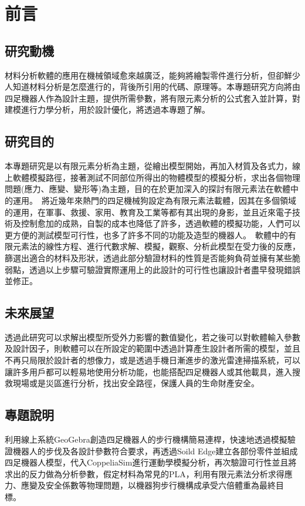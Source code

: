 \chapter{前言}
\renewcommand{\baselinestretch}{10.0} %
\setcounter{page}{1}  %
\fontsize{14pt}{2.5pt}\sectionef
\section{研究動機}
材料分析軟體的應用在機械領域愈來越廣泛，能夠將繪製零件進行分析，但卻鮮少人知道材料分析是怎麼進行的，背後所引用的代碼、原理等。本專題研究方向將由四足機器人作為設計主題，提供所需參數，將有限元素分析的公式套入並計算，對建模進行力學分析，用於設計優化，將透過本專題了解。

\section{研究目的}
本專題研究是以有限元素分析為主題，從繪出模型開始，再加入材質及各式力，線上軟體模擬路徑，接著測試不同部位所得出的物體模型的模擬分析，求出各個物理問題(應力、應變、變形等)為主題，目的在於更加深入的探討有限元素法在軟體中的運用。\
將近幾年來熱門的四足機械狗設定為有限元素法載體，因其在多個領域的運用，在軍事、救援、家用、教育及工業等都有其出現的身影，並且近來電子技術及控制愈加的成熟，自製的成本也降低了許多，透過軟體的模擬功能，人們可以更方便的測試模型可行性，也多了許多不同的功能及造型的機器人。\
軟體中的有限元素法的線性方程、進行代數求解、模擬，觀察、分析此模型在受力後的反應，篩選出適合的材料及形狀，透過此部分驗證材料的性質是否能夠負荷並擁有某些脆弱點，透過以上步驟可驗證實際運用上的此設計的可行性也讓設計者盡早發現錯誤並修正。\
\section{未來展望}
透過此研究可以求解出模型所受外力影響的數值變化，若之後可以對軟體輸入參數及設計因子，則軟體可以在所設定的範圍中透過計算產生設計者所需的模型，並且不再只局限於設計者的想像力，或是透過手機日漸進步的激光雷達掃描系統，可以讓許多用戶都可以輕易地使用分析功能，也能搭配四足機器人或其他載具，進入搜救現場或是災區進行分析，找出安全路徑，保護人員的生命財產安全。\
\section{專題說明}
利用線上系統GeoGebra創造四足機器人的步行機構簡易連桿，快速地透過模擬驗證機器人的步伐及各設計參數符合要求，再透過Soild Edge建立各部份零件並組成四足機器人模型，代入CoppeliaSim進行運動學模擬分析，再次驗證可行性並且將求出的反力做為分析參數，假定材料為常見的PLA，利用有限元素法分析求得應力、應變及安全係數等物理問題，以機器狗步行機構成承受六倍體重為最終目標。\
\renewcommand{\baselinestretch}{0.5} %
